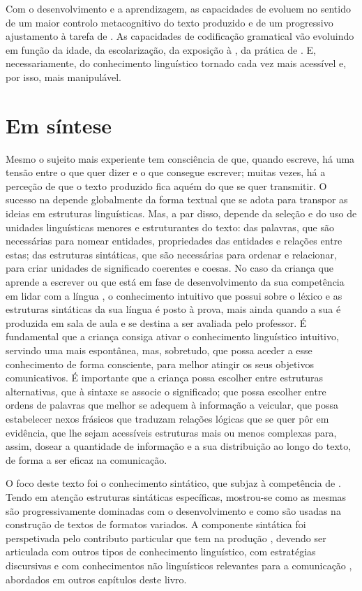 \documentclass[output=paper]{LSP/langsci}
\begin{document}
Com o desenvolvimento e a aprendizagem, as capacidades de  evoluem no sentido de um maior controlo metacognitivo do texto produzido e de um progressivo ajustamento à tarefa de . As capacidades de codificação gramatical vão evoluindo em função da idade, da escolarização, da exposição à , da prática de . E, necessariamente, do conhecimento linguístico tornado cada vez mais acessível e, por isso, mais manipulável. 

\section{Em síntese}
\label{sec:costacostagoncalves_conclusao}

Mesmo o sujeito mais experiente tem consciência de que, quando escreve, há uma tensão entre o que quer dizer e o que consegue escrever; muitas vezes, há a perceção de que o texto produzido fica aquém do que se quer transmitir. O sucesso na  depende globalmente da forma textual que se adota para transpor as ideias em estruturas linguísticas. Mas, a par disso, depende da seleção e do uso de unidades linguísticas menores e estruturantes do texto: das palavras, que são necessárias para nomear entidades, propriedades das entidades e relações entre estas; das estruturas sintáticas, que são necessárias para ordenar e relacionar, para criar unidades de significado coerentes e coesas. No caso da criança que aprende a escrever ou que está em fase de desenvolvimento da sua competência em lidar com a língua , o conhecimento intuitivo que possui sobre o léxico e as estruturas sintáticas da sua língua é posto à prova, mais ainda quando a sua  é produzida em sala de aula e se destina a ser avaliada pelo professor. É fundamental que a criança consiga ativar o conhecimento linguístico intuitivo, servindo uma  mais espontânea, mas, sobretudo, que possa aceder a esse conhecimento de forma consciente, para melhor atingir os seus objetivos comunicativos. É importante que a criança possa escolher entre estruturas alternativas, que à sintaxe se associe o significado; que possa escolher entre ordens de palavras que melhor se adequem à informação a veicular, que possa estabelecer nexos frásicos que traduzam relações lógicas que se quer pôr em evidência, que lhe sejam acessíveis estruturas mais ou menos complexas para, assim, dosear a quantidade de informação e a sua distribuição ao longo do texto, de forma a ser eficaz na comunicação. 


O foco deste texto foi o conhecimento sintático, que subjaz à competência de . Tendo em atenção estruturas sintáticas específicas, mostrou-se como as mesmas são progressivamente dominadas com o desenvolvimento e como são usadas na construção de textos de formatos variados. A componente sintática foi perspetivada pelo contributo particular que tem na produção , devendo ser articulada com outros tipos de conhecimento linguístico, com estratégias discursivas e com conhecimentos não linguísticos relevantes para a comunicação , abordados em outros capítulos deste livro. 
\sloppy
\printbibliography[heading=subbibliography,notkeyword=this]
\end{document}
